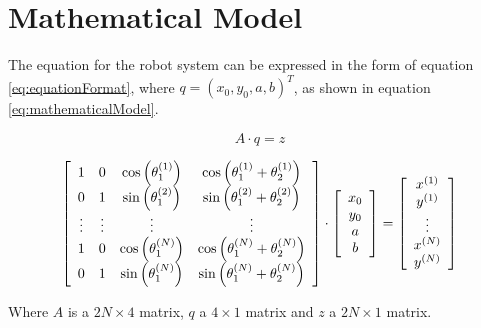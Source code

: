 \section{Mathematical Model}

The equation for the robot system can be expressed in the form of equation \ref{eq:equationFormat}, where $q = (x_0, y_0, a, b)^T$, as shown in equation \ref{eq:mathematicalModel}.

\begin{equation}
A \cdot q = z
\label{eq:equationFormat}
\end{equation}

\begin{equation}
\left[
\begin{array}{c c c c}
1 & 0 & \cos\left( \theta_1^{(1)}\right)  & \cos\left(\theta_1^{(1)} + \theta_2^{(1)} \right) \\
0 & 1 & \sin\left(\theta_1^{(2)}\right)  & \sin\left(\theta_1^{(2)} + \theta_2^{(2)}\right)  \\
\vdots & \vdots & \vdots & \vdots \\
1 & 0 & \cos\left(\theta_1^{(N)}\right)  & \cos\left(\theta_1^{(N)} + \theta_2^{(N)}\right)  \\
0 & 1 & \sin\left(\theta_1^{(N)}\right)  & \sin\left(\theta_1^{(N)} + \theta_2^{(N)}\right)  \\
\end{array}
\right]
\cdot
\left[
\begin{array}{c}
x_0 \\
y_0 \\
a \\
b \\
\end{array}
\right]
=
\left[
\begin{array}{c}
x^{(1)} \\
y^{(1)} \\
\vdots \\
x^{(N)} \\
y^{(N)} \\
\end{array}
\right]
\label{eq:mathematicalModel}
\end{equation}

Where $A$ is a $2 N \times 4$ matrix, $q$ a $4 \times 1$ matrix and $z$ a $2 N \times 1$ matrix.